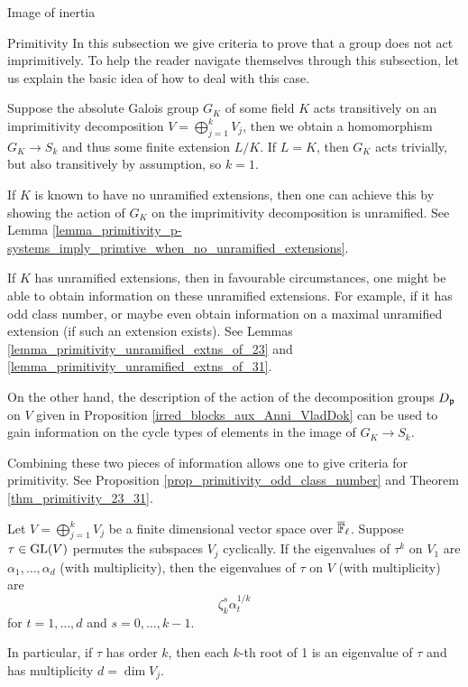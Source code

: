 \documentclass[11pt,a4paper]{article}
\begin{document}
\begin{section}{Image of inertia}
\begin{subsection}{Primitivity}
In this subsection we give criteria to prove that a group does not act imprimitively.
To help the reader navigate themselves through this subsection, let us explain the basic idea of how to deal with this case.

Suppose the absolute Galois group $G_K$ of some field $K$ acts transitively on an imprimitivity decomposition $V= \bigoplus^k_{j=1} V_j$, then we obtain a homomorphism $G_K \rightarrow S_k$ and thus some finite extension $L/K$.
If $L=K$, then $G_K$ acts trivially, but also transitively by assumption, so $k=1$.

If $K$ is known to have no unramified extensions, then one can achieve this by showing the action of $G_K$ on the imprimitivity decomposition is unramified.
See Lemma \ref{lemma_primitivity_p-systems_imply_primtive_when_no_unramified_extensions}.

If $K$ has unramified extensions, then in favourable circumstances, one might be able to obtain information on these unramified extensions.
For example, if it has odd class number, or maybe even obtain information on a maximal unramified extension (if such an extension exists).
See Lemmas \ref{lemma_primitivity_unramified_extns_of_23} and \ref{lemma_primitivity_unramified_extns_of_31}.

On the other hand, the description of the action of the decomposition groups $D_{\mathfrak{p}}$ on $V$ given in Proposition \ref{irred_blocks_aux_Anni_VladDok} can be used to gain information on the cycle types of elements in the image of $G_K \rightarrow S_k$.

Combining these two pieces of information allows one to give criteria for primitivity. See Proposition \ref{prop_primitivity_odd_class_number} and Theorem \ref{thm_primitivity_23_31}.

\begin{lemma}{\cite[Lemma 4.15]{Anni_VDok}}
\label{lemma_primitive_evalues}
Let $V= \bigoplus^k_{j=1} V_j$ be a finite dimensional vector space over ${\overline{\mathbb{F}}_\ell}$. Suppose $\tau \in \GL(V)$ permutes the subspaces $V_j$ cyclically. If the eigenvalues of $\tau^k$ on $V_1$ are $\alpha_1 , \ldots , \alpha_d$ (with multiplicity), then the eigenvalues of $\tau$ on $V$ (with multiplicity) are 
\[\zeta_k^s \alpha_t^{1/k}\]
for $t = 1, \ldots, d$ and $s = 0, \ldots, k-1$.

In particular, if $\tau$ has order $k$, then each $k$-th root of 1 is an eigenvalue of $\tau$ and has multiplicity $d=\dim V_j$.
\end{lemma}


\end{subsection}
\end{section}
\end{document}

